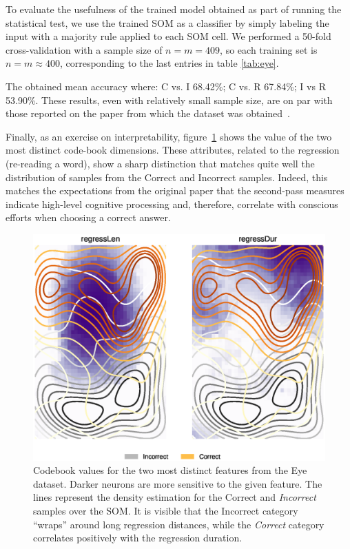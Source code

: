 To evaluate the usefulness of the trained model obtained as part of running the
statistical test, we use the trained SOM as a classifier by simply labeling the input
with a majority rule applied to each SOM cell. We performed a 50-fold cross-validation
with a sample size of $n=m=409$, so each training set is $n=m\approx 400$, corresponding
to the last entries in table \ref{tab:eye}.

The obtained mean accuracy where: C vs. I 68.42\%; C vs. R 67.84\%; I vs R 53.90\%.
These results, even with relatively small sample size, are on par with those reported
on the paper from which the dataset was obtained~\cite{salojarvi2005inferring}.

Finally, as an exercise on interpretability, figure~\ref{fig:eye_distinct_features} shows
the value of the two most distinct code-book dimensions. These
attributes, related to the regression (re-reading a word), show a sharp distinction
that matches quite well the distribution of samples from the Correct and Incorrect samples.
Indeed, this matches the expectations from the original paper that the second-pass
measures indicate high-level cognitive processing and, therefore, correlate with
conscious efforts when choosing a correct answer.

\begin{figure}[htb]
    \centering
    \includegraphics[width=\textwidth]{images/4_som/eye_regress.eps}
    \caption{Codebook values for the two most distinct features from the Eye dataset.
    Darker neurons are more sensitive to the given feature.
    The lines represent the density estimation for the Correct and \emph{Incorrect} samples over the SOM.
    It is visible that the Incorrect category ``wraps'' around long regression distances, while the
    \emph{Correct} category correlates positively with the regression duration.}
    \label{fig:eye_distinct_features}
\end{figure}


